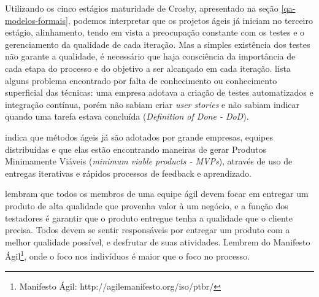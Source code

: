 \documentclass[
	12pt,				%
	openright,			%
	oneside,			%
	a4paper,			%
	english,			%
	brazil,				%
	]{abntex2}
\begin{document}
Utilizando os cinco estágios maturidade de Crosby, apresentado na seção \autoref{qa-modelos-formais}, podemos interpretar que os projetos ágeis já iniciam no terceiro estágio, alinhamento, tendo em vista a preocupação constante com os testes e o gerenciamento da qualidade de cada iteração. Mas a simples existência dos testes não garante a qualidade, é necessário que haja consciência da importância de cada etapa do processo e do objetivo a ser alcançado em cada iteração.  lista alguns problema encontrado por falta de conhecimento ou conhecimento superficial das técnicas: uma empresa adotava a criação de testes automatizados e integração contínua, porém não sabiam criar \emph{user stories} e não sabiam indicar quando uma tarefa estava concluída (\emph{Definition of Done - DoD}). %

 indica que métodos ágeis já são adotados por grande empresas, equipes distribuídas e que elas estão encontrando maneiras de gerar Produtos Minimamente Viáveis (\emph{minimum viable products - MVPs}), através de uso de entregas iterativas e rápidos processos de feedback e aprendizado.



 lembram que todos os membros de uma equipe ágil devem focar em entregar um produto de alta qualidade que provenha valor à um negócio, e a função dos testadores é garantir que o produto entregue tenha a qualidade que o cliente precisa. Todos devem se sentir responsáveis por entregar um produto com a melhor qualidade possível, e desfrutar de suas atividades. Lembrem do Manifesto Ágil\footnote{Manifesto Ágil: http://agilemanifesto.org/iso/ptbr/}, onde o foco nos indivíduos é maior que o foco no processo.%
\end{document}
